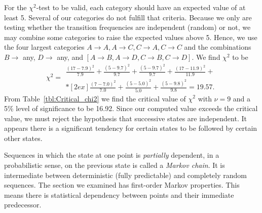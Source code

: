 \begin{example}
     For the $\chi^2$-test to be valid, each category should have an expected value of at least 5.  Several 
of our categories do not fulfill that criteria.  Because we only are testing whether the transition 
frequencies are independent (random) or not, we may combine some categories to raise the 
expected values above 5.  Hence, we use the four largest categories $A\rightarrow A, A\rightarrow C, C\rightarrow A, C\rightarrow C$ and
the combinations $B\rightarrow$ any, $D\rightarrow$ any, and $[ A\rightarrow B, A\rightarrow D, C\rightarrow B, C\rightarrow D ]$.  We find $\chi^2$ to be 
\begin{equation}
\chi^2 = \begin{array}{c}
\displaystyle \frac{(17 - 7.9)^2}{7.9} +  \frac{(5 - 9.7)^2}{9.7} + \frac{(5-9.7)^2}{9.7} +   \frac{(17 - 11.9)^2}{11.9} + \\*[2ex]
\displaystyle \frac{(7-7.0)^2}{7.0} +  \frac{(5-5.0)^2}{5.0} +    \frac{(5-9.8)^2}{9.8} = 19.57.
\end{array}
\end{equation}
From Table~\ref{tbl:Critical_chi2} we find the critical value of $\chi^2$ with $\nu = 9$ and a 5\% level of significance to be 16.92.  
Since our computed value exceeds the critical value, we must reject the hypothesis that 
successive states are independent.  It appears there is a significant tendency for certain states to 
be followed by certain other states.  
\end{example}

     Sequences in which the state at one point is \emph{partially} dependent, in a probabilistic sense, on 
the previous state is called a \emph{Markov chain}.  It is intermediate between deterministic (fully 
predictable) and completely random sequences.  The section we examined has first-order 
Markov properties.  This means there is statistical dependency between points and their 
immediate predecessor. 

